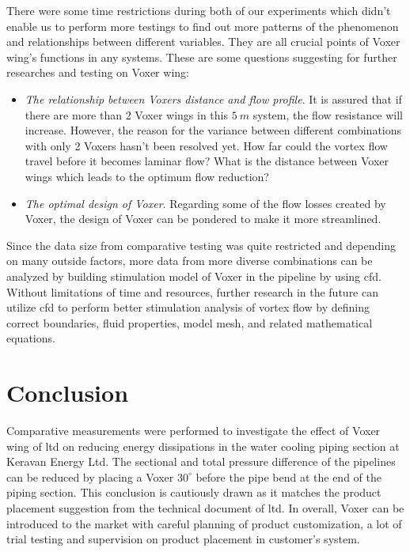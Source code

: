 There were some time restrictions during both of our experiments which didn't enable us to perform more testings to find out more patterns of the phenomenon and relationships between different variables. They are all crucial points of Voxer wing's functions in any systems. These are some questions suggesting for further researches and testing on Voxer wing:
\begin{itemize}
  \item \textit{The relationship between Voxers distance and flow profile}. It is assured that if there are more than 2 Voxer wings in this $5\ m$ system, the flow resistance will increase. However, the reason for the variance between different combinations with only 2 Voxers hasn't been resolved yet. How far could the vortex flow travel before it becomes laminar flow? What is the distance between Voxer wings which leads to the optimum flow reduction? 
  \item \textit{The optimal design of Voxer}. Regarding some of the flow losses created by Voxer, the design of Voxer can be pondered to make it more streamlined. 
\end{itemize} 

Since the data size from comparative testing was quite restricted and depending on many outside factors, more data from more diverse combinations can be analyzed by building stimulation model of Voxer in the pipeline by using \gls{cfd}. Without limitations of time and resources, further research in the future can utilize \gls{cfd} to perform better stimulation analysis of vortex flow by defining correct boundaries, fluid properties, model mesh, and related mathematical equations. 

\section{Conclusion}

Comparative measurements were performed to investigate the effect of Voxer wing of \gls{ltd} on reducing energy dissipations in the water cooling piping section at Keravan Energy Ltd. The sectional and total pressure difference of the pipelines can be reduced by placing a Voxer $30^{\circ}$ before the pipe bend at the end of the piping section. This conclusion is cautiously drawn as it matches the product placement suggestion from the technical document of \gls{ltd}. In overall, Voxer can be introduced to the market with careful planning of product customization, a lot of trial testing and supervision on product placement in customer's system. 

\clearpage %
